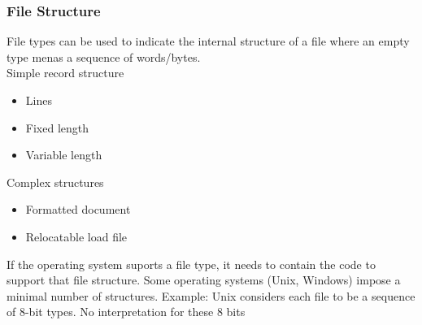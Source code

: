 \documentclass[oneside]{book}
\begin{document}
                \subsubsection{File Structure}
                    File types can be used to indicate the internal structure of a file where an empty type
                    menas a sequence of words/bytes.\\
                    Simple record structure
                    \begin{itemize}
                        \item Lines
                        \item Fixed length
                        \item Variable length
                    \end{itemize}
                    Complex structures
                    \begin{itemize}
                        \item Formatted document
                        \item Relocatable load file
                    \end{itemize}
                    If the operating system suports a file type, it needs to contain the code to support that file structure.
                    Some operating systems (Unix, Windows) impose a minimal number of structures.
                    \subitem Example: Unix considers each file to be a sequence of 8-bit types. No interpretation for these 
                    8 bits
\end{document}
